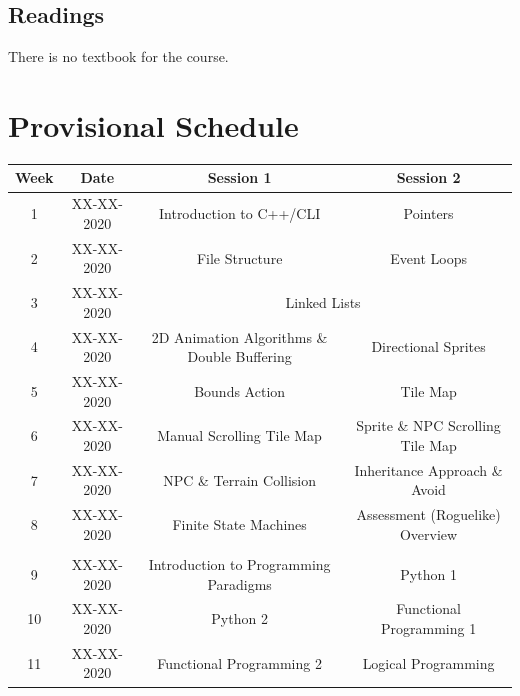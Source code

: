 \documentclass{article}
\begin{document}
\subsection*{Readings}
There is no textbook for the course.

\section*{Provisional Schedule}

\renewcommand{\arraystretch}{1.5}
\begin{tabular}{|c|c|c|c|}
	\hline
	\textbf{Week} & \textbf{Date} & \textbf{Session 1}                          & \textbf{Session 2}                   \\ \hline
	1             & XX-XX-2020    & Introduction to C++/CLI                     & Pointers                             \\ \hline
	2             & XX-XX-2020    & File Structure                              & Event Loops                          \\ \hline
	3             & XX-XX-2020    & \multicolumn{2}{c|}{Linked Lists}                                                  \\ \hline
	4             & XX-XX-2020    & 2D Animation Algorithms \& Double Buffering & Directional Sprites                  \\ \hline
	5             & XX-XX-2020    & Bounds Action                               & Tile Map                             \\ \hline
	6             & XX-XX-2020    & Manual Scrolling Tile Map                   & Sprite \& NPC Scrolling Tile Map     \\ \hline
	7             & XX-XX-2020    & NPC \& Terrain Collision                    & Inheritance Approach \& Avoid        \\ \hline
	8             & XX-XX-2020    & Finite State Machines                       & Assessment (Roguelike) Overview      \\ \hline
	\rowcolor{yellow} \multicolumn{4}{|c|}{Mid Term Break}                                                             \\ \hline
	9             & XX-XX-2020    & Introduction to Programming Paradigms       & Python 1                             \\ \hline
	10            & XX-XX-2020    & Python 2                                    & Functional Programming 1             \\ \hline
	11            & XX-XX-2020    & Functional Programming 2                    & Logical Programming                  \\ \hline

\end{tabular}
\end{document}
